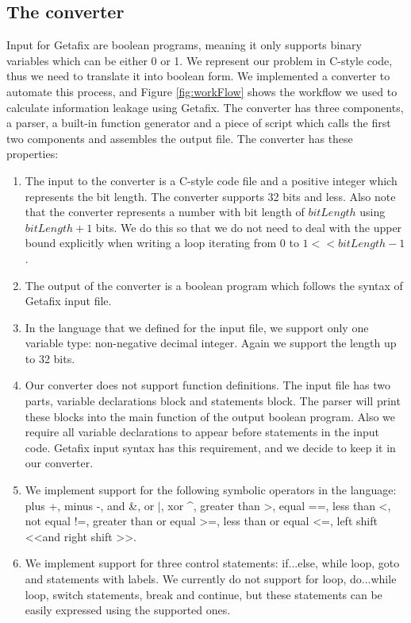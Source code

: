\subsection{The converter}
Input for Getafix are boolean programs, meaning it only supports binary variables which can be either 0 or 1. We represent our problem in C-style code, thus we need to translate it into boolean form. We implemented a converter to automate this process, and Figure \ref{fig:workFlow} shows the workflow we used to calculate information leakage using Getafix. The converter has three components, a parser, a built-in function generator and a piece of script which calls the first two components and assembles the output file. The converter has these properties:

\begin{enumerate}
\item The input to the converter is a C-style code file and a positive integer which represents the bit length. The converter supports 32 bits and less. Also note that the converter represents a number with bit length of $bitLength$ using $bitLength + 1$ bits. We do this so that we do not need to deal with the upper bound explicitly when writing a loop iterating from $0$ to $1<<bitLength - 1$.
\item The output of the converter is a boolean program which follows the syntax of Getafix input file.
\item In the language that we defined for the input file, we support only one variable type: non-negative decimal integer. Again we support the length up to 32 bits.
\item Our converter does not support function definitions. The input file has two parts, variable declarations block and statements block. The parser will print these blocks into the main function of the output boolean program. Also we require all variable declarations to appear before statements in the input code. Getafix input syntax has this requirement, and we decide to keep it in our converter.
\item We implement support for the following symbolic operators in the language: plus +, minus -, and \&, or $|$, xor \textasciicircum , greater than \textgreater, equal ==, less than \textless, not equal !=, greater than or equal \textgreater=, less than or equal \textless=, left shift \textless\textless and right shift \textgreater\textgreater.
\item We implement support for three control statements: if...else, while loop, goto and statements with labels. We currently do not support for loop, do...while loop, switch statements, break and continue, but these statements can be easily expressed using the supported ones.
\end{enumerate}

